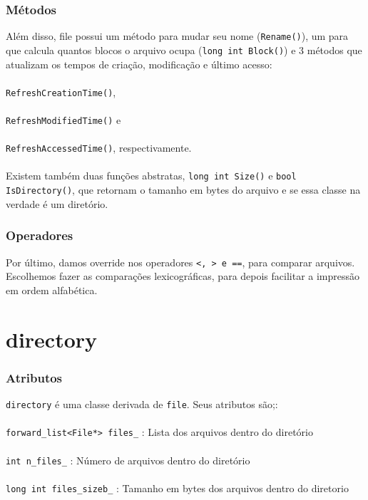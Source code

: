 \documentclass{beamer}
\begin{document}
\begin{frame}
	 \frametitle{Métodos}
	Além disso, file possui um método para mudar seu nome (\texttt{Rename()}), um para que calcula quantos blocos o arquivo ocupa (\texttt{long int Block()}) e 3 métodos que atualizam os tempos de criação, modificação e último acesso:\\~\\
	\texttt{RefreshCreationTime()},\\~\\
	\texttt{RefreshModifiedTime()} e \\~\\
	\texttt{RefreshAccessedTime()}, respectivamente. \\~\\
	
	Existem também duas funções abstratas, \texttt{long int Size()} e \texttt{bool IsDirectory()}, que retornam o tamanho em bytes do arquivo e se essa classe na verdade é um diretório.
\end{frame}

\begin{frame}
	\frametitle{Operadores}
	Por último, damos override nos operadores \texttt{<, > e ==}, para comparar arquivos. Escolhemos fazer as comparações lexicográficas, para depois facilitar a impressão em ordem alfabética. 
\end{frame}

\section{directory}

\begin{frame}
  \frametitle{Atributos}
  \texttt{directory} é uma classe derivada de \texttt{file}. Seus atributos são;:\\~\\
  
  \texttt{forward\_list<File*> files\_}   : Lista dos arquivos dentro do diretório\\~\\
  \texttt{int n\_files\_}                : Número de arquivos dentro do diretório\\~\\
  \texttt{long int files\_sizeb\_}       : Tamanho em bytes dos arquivos dentro do diretorio\\~\\
      

\end{frame}
\end{document}
